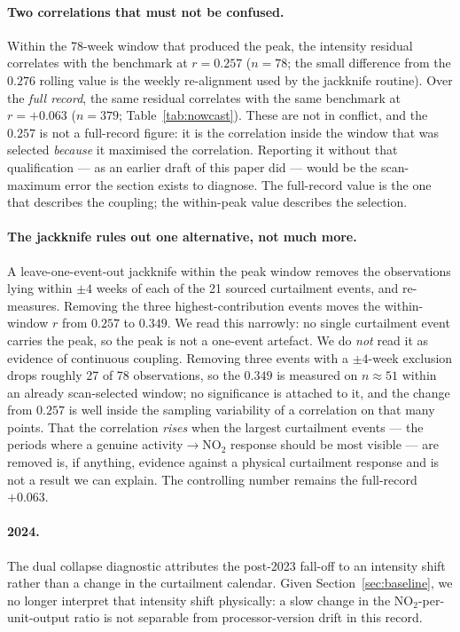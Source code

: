\documentclass[11pt,a4paper]{article}
\newcommand{\rval}[1]{\mbox{$r=#1$}}
\providecommand{\ce}[1]{\ensuremath{\mathrm{#1}}}
\begin{document}
\paragraph{Two correlations that must not be confused.} Within the 78-week window that produced
the peak, the intensity residual correlates with the benchmark at \rval{0.257} ($n=78$; the small
difference from the $0.276$ rolling value is the weekly re-alignment used by the jackknife
routine). Over the \emph{full record}, the same residual correlates with the same benchmark at
\rval{+0.063} ($n=379$; Table~\ref{tab:nowcast}). These are not in conflict, and the $0.257$ is
not a full-record figure: it is the correlation inside the window that was selected \emph{because}
it maximised the correlation. Reporting it without that qualification --- as an earlier draft of
this paper did --- would be the scan-maximum error the section exists to diagnose. The full-record
value is the one that describes the coupling; the within-peak value describes the selection.

\paragraph{The jackknife rules out one alternative, not much more.} A leave-one-event-out
jackknife within the peak window removes the observations lying within $\pm4$ weeks of each of the
21 sourced curtailment events, and re-measures. Removing the three highest-contribution events
moves the within-window $r$ from $0.257$ to $0.349$. We read this narrowly: no single curtailment
event carries the peak, so the peak is not a one-event artefact. We do \emph{not} read it as
evidence of continuous coupling. Removing three events with a $\pm4$-week exclusion drops roughly
27 of 78 observations, so the $0.349$ is measured on $n\approx51$ within an already
scan-selected window; no significance is attached to it, and the change from $0.257$ is well
inside the sampling variability of a correlation on that many points. That the correlation
\emph{rises} when the largest curtailment events --- the periods where a genuine
activity$\to$\ce{NO_2} response should be most visible --- are removed is, if anything, evidence
against a physical curtailment response and is not a result we can explain. The controlling number
remains the full-record $+0.063$.

\paragraph{2024.} The dual collapse diagnostic attributes the post-2023 fall-off to an intensity
shift rather than a change in the curtailment calendar. Given Section~\ref{sec:baseline}, we no
longer interpret that intensity shift physically: a slow change in the \ce{NO_2}-per-unit-output
ratio is not separable from processor-version drift in this record.
\end{document}
